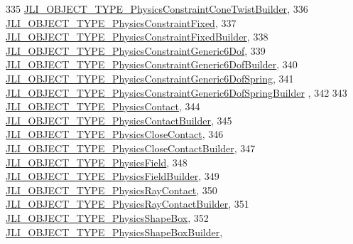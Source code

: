 \begin{DoxyCode}
335     \mbox{\hyperlink{namespacenjli_a6d56d4fbaf89fcf3e3d32839df05b444a62739a7a2007006ba1fde0db9bcd73e8}{JLI\_OBJECT\_TYPE\_PhysicsConstraintConeTwistBuilder}},
336     \mbox{\hyperlink{namespacenjli_a6d56d4fbaf89fcf3e3d32839df05b444a9789d2b072ff7710d51fbf9406163975}{JLI\_OBJECT\_TYPE\_PhysicsConstraintFixed}},
337     \mbox{\hyperlink{namespacenjli_a6d56d4fbaf89fcf3e3d32839df05b444a6d8f591805f54af681b74dee6c1c846b}{JLI\_OBJECT\_TYPE\_PhysicsConstraintFixedBuilder}},
338     \mbox{\hyperlink{namespacenjli_a6d56d4fbaf89fcf3e3d32839df05b444a5149a83507667667e84b113e78529cf6}{JLI\_OBJECT\_TYPE\_PhysicsConstraintGeneric6Dof}},
339     \mbox{\hyperlink{namespacenjli_a6d56d4fbaf89fcf3e3d32839df05b444a8ab3c130238d63bc31105dccd1375acc}{JLI\_OBJECT\_TYPE\_PhysicsConstraintGeneric6DofBuilder}},
340     \mbox{\hyperlink{namespacenjli_a6d56d4fbaf89fcf3e3d32839df05b444a8c3f25125ebf6314314fbb0923163e2d}{JLI\_OBJECT\_TYPE\_PhysicsConstraintGeneric6DofSpring}},
341     \mbox{\hyperlink{namespacenjli_a6d56d4fbaf89fcf3e3d32839df05b444ac0d10efd09a2d1e269af9c8c3b522db1}{JLI\_OBJECT\_TYPE\_PhysicsConstraintGeneric6DofSpringBuilder}}
      ,
342 
343     \mbox{\hyperlink{namespacenjli_a6d56d4fbaf89fcf3e3d32839df05b444a3c7e2ca128207d9f821ae47b8ace8b82}{JLI\_OBJECT\_TYPE\_PhysicsContact}},
344     \mbox{\hyperlink{namespacenjli_a6d56d4fbaf89fcf3e3d32839df05b444a7dcb3257dd1a77063e3ef9c2e15bb1e8}{JLI\_OBJECT\_TYPE\_PhysicsContactBuilder}},
345     \mbox{\hyperlink{namespacenjli_a6d56d4fbaf89fcf3e3d32839df05b444a226b64ff870ea637c0316c09f416b249}{JLI\_OBJECT\_TYPE\_PhysicsCloseContact}},
346     \mbox{\hyperlink{namespacenjli_a6d56d4fbaf89fcf3e3d32839df05b444a2b0c8c9c2632a668cdc459457dcc2104}{JLI\_OBJECT\_TYPE\_PhysicsCloseContactBuilder}},
347     \mbox{\hyperlink{namespacenjli_a6d56d4fbaf89fcf3e3d32839df05b444a2752ef6e53e1bcfa8704c2e3f7815c06}{JLI\_OBJECT\_TYPE\_PhysicsField}},
348     \mbox{\hyperlink{namespacenjli_a6d56d4fbaf89fcf3e3d32839df05b444ad97d52663b698eca329ade99182c03ed}{JLI\_OBJECT\_TYPE\_PhysicsFieldBuilder}},
349     \mbox{\hyperlink{namespacenjli_a6d56d4fbaf89fcf3e3d32839df05b444a9ff87602d405d1b18c20d2bc6645b639}{JLI\_OBJECT\_TYPE\_PhysicsRayContact}},
350     \mbox{\hyperlink{namespacenjli_a6d56d4fbaf89fcf3e3d32839df05b444a7625048d00ed70e09e02d98eb7950696}{JLI\_OBJECT\_TYPE\_PhysicsRayContactBuilder}},
351     \mbox{\hyperlink{namespacenjli_a6d56d4fbaf89fcf3e3d32839df05b444a928a72d79828f59158b0c8ec166ee001}{JLI\_OBJECT\_TYPE\_PhysicsShapeBox}},
352     \mbox{\hyperlink{namespacenjli_a6d56d4fbaf89fcf3e3d32839df05b444ac0cd2f461992f268a3652aed53ff1330}{JLI\_OBJECT\_TYPE\_PhysicsShapeBoxBuilder}},

\end{DoxyCode}
